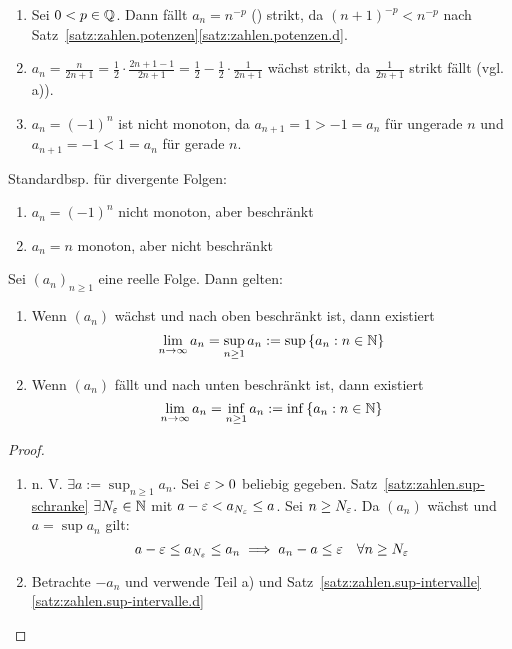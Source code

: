 \documentclass[12pt]{scrreprt}
\begin{document}
\begin{bsp}
  \label{bsp:konv.monotonie}
  \begin{enumerate}
  \item Sei $0<p\in\mathbb{Q}$. Dann fällt $a_n=n^{-p}$ () strikt,
    da $(n+1)^{-p}<n^{-p}$ nach
    Satz~\ref{satz:zahlen.potenzen}\ref{satz:zahlen.potenzen.d}.
  \item $a_n = \frac{n}{2n+1} = \frac12\cdot\frac{2n+1-1}{2n+1} =
    \frac12 - \frac12\cdot\frac{1}{2n+1}$ wächst strikt, da
    $\frac{1}{2n+1}$ strikt fällt (vgl. a)).
  \item $a_n=(-1)^n$ ist nicht monoton, da $a_{n+1}=1>-1=a_n$ für
    ungerade $n$ und $a_{n+1}=-1<1=a_n$ für gerade $n$.
  \end{enumerate}
\end{bsp}

\noindent Standardbsp. für divergente Folgen:
\begin{enumerate}
\item $a_n=(-1)^n$ nicht monoton, aber beschränkt
\item $a_n=n$ monoton, aber nicht beschränkt
\end{enumerate}

\begin{thm}
  \label{thm:konv.mon-beschr}
  Sei $(a_n)_{n\ge1}$ eine reelle Folge. Dann gelten:
  \begin{enumerate}
  \item Wenn $(a_n)$ wächst und nach oben beschränkt ist, dann
    existiert
    \[\lim_{n\rightarrow\infty}{a_n}=\sup_{n\ge1}{a_n}:=\sup{\{a_n:\ensuremath{n\in\mathbb{N}}\}}\]
    \label{thm:konv.mon-beschr.a}
  \item Wenn $(a_n)$ fällt und nach unten beschränkt ist, dann
    existiert
    \[\lim_{n\rightarrow\infty}{a_n}=\inf_{n\ge1}{a_n}:=\inf{\{a_n:\ensuremath{n\in\mathbb{N}}\}}\]
    \label{thm:konv.mon-beschr.b}
  \end{enumerate}
\end{thm}
\begin{proof}
  \begin{enumerate}
  \item n. V. $\exists a:=\sup_{n\ge1}{a_n}$. Sei $\varepsilon>0$ beliebig
    gegeben. Satz~\ref{satz:zahlen.sup-schranke} \folgt $\exists
    N_\varepsilon\in\mathbb{N}$ mit $a-\varepsilon < a_{N_\varepsilon}\le a$. Sei $n\ge N_\varepsilon$. Da
    $(a_n)$ wächst und $a=\sup{a_n}$ gilt:
    \[a-\varepsilon \le a_{N_\varepsilon} \le a_n \implies a_n-a \le \varepsilon \quad \forall
    n\ge N_\varepsilon\]
  \item Betrachte $-a_n$ und verwende Teil a) und
    Satz~\ref{satz:zahlen.sup-intervalle}\ref{satz:zahlen.sup-intervalle.d}
  \end{enumerate}
\end{proof}
\end{document}
